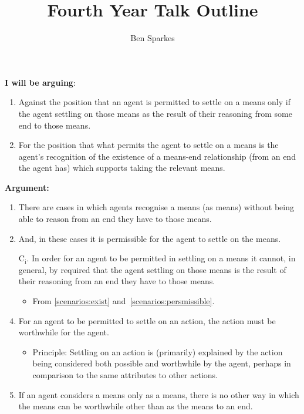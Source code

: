 \documentclass[10pt]{article}
\title{Fourth Year Talk Outline}
\author{Ben Sparkes}
\begin{document}
\pagestyle{empty}

\noindent \textbf{I will be arguing}:
\begin{enumerate}[label=\roman*.]
\item Against the position that an agent is permitted to settle on a means only if the agent settling on those means as the result of their reasoning from some end to those means.

\item For the position that what permits the agent to settle on a means is the agent's recognition of the existence of a means-end relationship (from an end the agent has) which supports taking the relevant means.
\end{enumerate}

\noindent\textbf{Argument:}

\begin{enumerate}

\item\label{scenarios:exist} There are cases in which agents recognise a means (as means) without being able to reason from an end they have to those means.

\item\label{scenarios:persmissible} And, in these cases it is permissible for the agent to settle on the means.

\item[C\(_{\text{i}}\).]\label{scenario:no-reasoning} In order for an agent to be permitted in settling on a means it cannot, in general, by required that the agent settling on those means is the result of their reasoning from an end they have to those means.

  \begin{itemize}
  \item From \ref{scenarios:exist} and~\ref{scenarios:persmissible}.
  \end{itemize}

\item\label{settle:worthwhile} For an agent to be permitted to settle on an action, the action must be worthwhile for the agent.

  \begin{itemize}
  \item Principle: Settling on an action is (primarily) explained by the action being considered both possible and worthwhile by the agent, perhaps in comparison to the same attributes to other actions.
  \end{itemize}

\item\label{m-e:dependence} If an agent considers a means only as a means, there is no other way in which the means can be worthwhile other than as the means to an end.


\end{enumerate}
\end{document}
